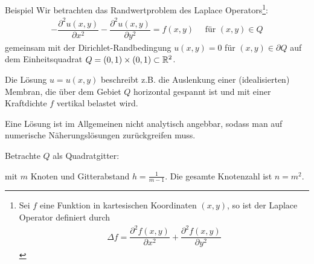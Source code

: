 \begin{colboxBreakable}{Beispiel}\label{bsp:pdeBsp}
  Wir betrachten das Randwertproblem des Laplace Operators\footnote{
    Sei $f$ eine Funktion in kartesischen Koordinaten $(x,y)$, so ist der Laplace Operator definiert durch 
    \begin{align*}
      \Delta f = \dfrac{\partial^2 f(x,y)}{\partial x^2} + \dfrac{\partial^2 f(x,y)}{\partial y^2}
    \end{align*}
    }:
  \begin{align*}
    -\dfrac{\partial^2 u(x,y)}{\partial x^2} 
    - \dfrac{\partial^2 u(x,y)}{\partial y^2} 
    = f(x,y) \quad 
    \text{ für } (x,y)\in Q
  \end{align*}
  gemeinsam mit der Dirichlet-Randbedingung $u(x,y)=0$ für $(x,y)\in \partial Q$ auf dem Einheitsquadrat 
  $Q=(0,1)\times(0,1)\subset\mathbb R^2$. 

  Die Lösung $u=u(x,y)$ beschreibt z.B. die Auslenkung einer (idealisierten) Membran, die über dem Gebiet $Q$ 
  horizontal gespannt ist und mit einer Kraftdichte $f$ vertikal belastet wird. 

  Eine Lösung ist im Allgemeinen nicht analytisch angebbar, sodass man auf numerische Näherungslösungen 
  zurückgreifen muss.

  Betrachte $Q$ als Quadratgitter: 

  \begin{center}
    
  \end{center}

  mit $m$ Knoten und Gitterabstand $h=\tfrac{1}{m-1}$. Die gesamte Knotenzahl ist $n=m^2$. 


\end{colboxBreakable}
